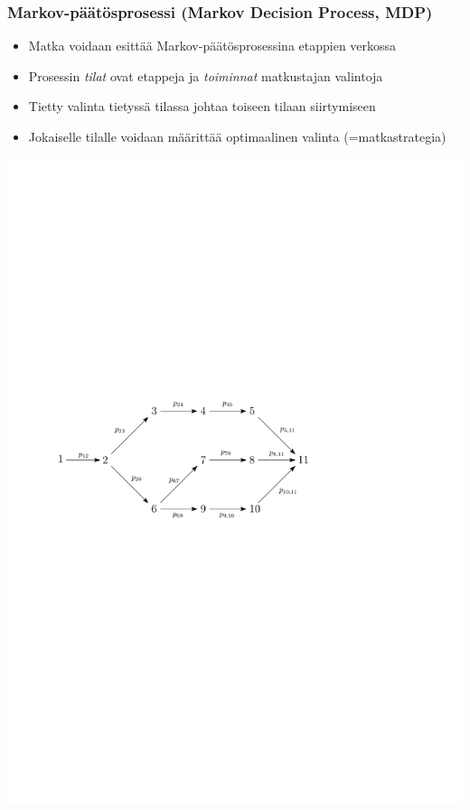 \documentclass{beamer}
\begin{document}
    
        \begin{frame}
  \frametitle{Markov-päätösprosessi (Markov Decision Process, MDP)} 
  \begin{itemize}
   \item 
    Matka voidaan esittää Markov-päätösprosessina etappien verkossa
    \item
    Prosessin \emph{tilat} ovat etappeja ja \emph{toiminnat} matkustajan valintoja 
    \item
    Tietty valinta tietyssä tilassa johtaa toiseen tilaan siirtymiseen
    \item
    Jokaiselle tilalle voidaan määrittää optimaalinen valinta (=matkastrategia) 
\end{itemize}
     \begin{center}
     \includegraphics[scale=0.55]{walking01c}
      \end{center}
    \end{frame} 
    
\end{document}
